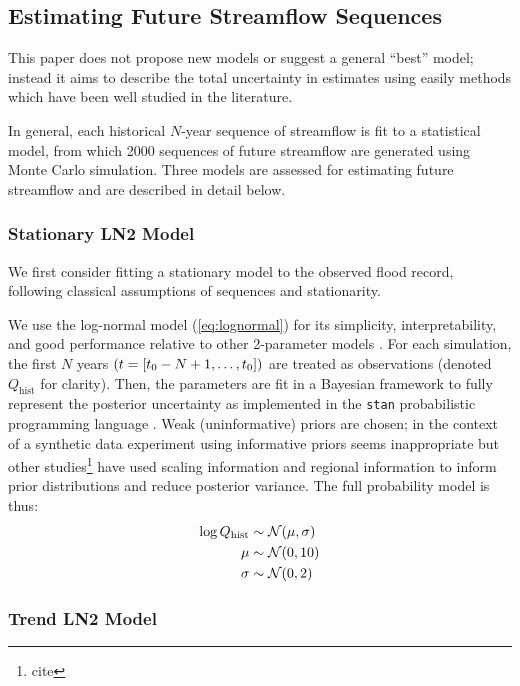 \documentclass[12pt]{article}
\begin{document}
\subsection{Estimating Future Streamflow Sequences\label{sec:estimation}}

This paper does not propose new models or suggest a general ``best'' model; instead it aims to describe the total uncertainty in estimates using easily methods which have been well studied in the literature.

In general, each historical \(N\)-year sequence of streamflow is fit to a statistical model, from which 2000 sequences of future streamflow are generated using Monte Carlo simulation.
Three models are assessed for estimating future streamflow and are described in detail below.

\subsubsection{Stationary LN2 Model\label{sec:method-stationary}}

We first consider fitting a stationary model to the observed flood record, following classical assumptions of \iid sequences and stationarity.

We use the log-normal model (\cref{eq:lognormal}) for its simplicity, interpretability, and good performance relative to other 2-parameter models \citep{Vogel1996}.
For each simulation, the first \(N\) years \(\qty(t=[t_0-N+1, \ldots, t_0])\) are treated as observations (denoted \(Q_{\text{hist}}\) for clarity).
Then, the parameters are fit in a Bayesian framework to fully represent the posterior uncertainty as implemented in the \texttt{stan} probabilistic programming language \citep{Carpenter2016}.
Weak (uninformative) priors are chosen; in the context of a synthetic data experiment using informative priors seems inappropriate but other studies\footnote{cite} have used scaling information and regional information to inform prior distributions and reduce posterior variance.
The full probability model is thus:
\begin{align}
  \log Q_\text{hist} & \sim \mathcal{N} \qty(\mu, \sigma) \\
  \mu &\sim \mathcal{N} \qty(0, 10) \\
  \sigma &\sim \mathcal{N} \qty(0, 2)
\end{align}

\subsubsection{Trend LN2 Model\label{sec:method-trend}}
\end{document}
